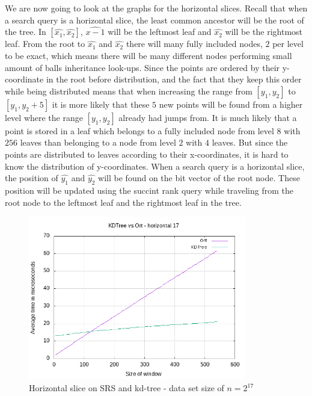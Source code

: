We are now going to look at the graphs for the horizontal slices. Recall that when a search query is a horizontal slice, the least common ancestor will be the root of the tree. In $[\hat{x_1}, \hat{x_2}]$, $\hat{x-1}$ will be the leftmost leaf and $\hat{x_2}$ will be the rightmost leaf. From the root to $\hat{x_1}$ and $\hat{x_2}$ there will many fully included nodes, $2$ per level to be exact, which means there will be many different nodes performing small amount of balls inheritance look-ups. Since the points are ordered by their y-coordinate in the root before distribution, and the fact that they keep this order while being distributed means that when increasing the range from $[y_1, y_2]$ to $[y_1, y_2 + 5]$ it is more likely that these $5$ new points will be found from a higher level where the range $[y_1, y_2]$ already had jumps from. It is much likely that a point is stored in a leaf which belongs to a fully included node from level $8$ with $256$ leaves than belonging to a node from level $2$ with $4$ leaves. But since the points are distributed to leaves according to their x-coordinates, it is hard to know the distribution of y-coordinates. When a search query is a horizontal slice, the position of $\hat{y_1}$ and $\hat{y_2}$ will be found on the bit vector of the root node. These position will be updated using the succint rank query while traveling from the root node to the leftmost leaf and the rightmost leaf in the tree.

\begin{figure}[h]
    \centering
    \includegraphics[width = 0.85\textwidth]{pictures/analysis/hori_17.png}
    \caption{Horizontal slice on SRS and kd-tree - data set size of $n=2^{17}$}\label{fig:hori_17}
\end{figure}

